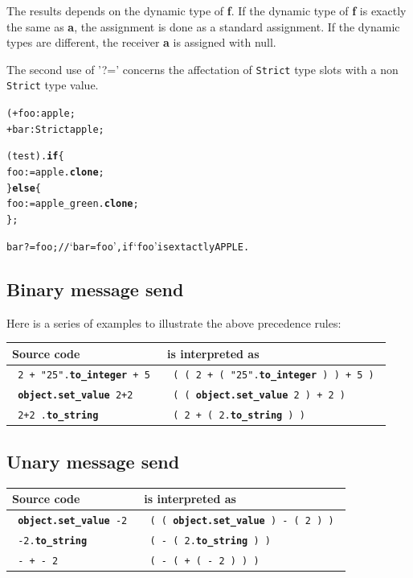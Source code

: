 \documentclass[11pt]{mybook}
\begin{document}
The results depends on the dynamic type of {\bf{}f}.
If the dynamic type of {\bf{}f} is exactly the same as {\bf{}a}, the assignment is done as a standard assignment.
If the dynamic types are different, the receiver {\bf{}a} is assigned with {\sc{}null}.

The second use of '?=' concerns the affectation of {\tt{}Strict} type slots  
with a non {\tt{}Strict} type value.
\begin{alltt}
  ( + foo:{\sc{}apple};
    + bar:{\tt{}Strict} {\sc{}apple};

    (test).{\bf{}if} \{
      foo := {\sc{}apple}.{\bf{}clone};
    \} {\bf{}else} \{
      foo := {\sc{}apple\_green}.{\bf{}clone};
    \}; 

   bar ?= foo; // `bar = foo', if `foo' is extactly APPLE.
\end{alltt}

\subsection{Binary message send}
\label{language_reference:late_binding:binary_msg_send}
%
Here is a series of examples to illustrate the above precedence
rules:

\noindent
\begin{tabularx}{\textwidth}{X X}
\hline
{\bf{}Source code}                       & {\bf{}is interpreted as} \\
\hline
\hline
{\tt{} 2 + "25".{\bf{}to\_integer} + 5 } & {\tt{} ( ( 2 + ( "25".{\bf{}to\_integer} ) ) + 5 ) } \\
\hline
{\tt{} {\bf{}object.set\_value} 2+2 }    & {\tt{} ( ( {\bf{}object.set\_value} 2 ) + 2 ) } \\
\hline
{\tt{} 2+2 .{\bf{}to\_string} }          & {\tt{} ( 2 + ( 2.{\bf{}to\_string} ) ) } \\
\hline
\end{tabularx}

\subsection{Unary message send}
\label{language_reference:late_binding:unary_msg_send}
%
\noindent
\begin{tabularx}{\textwidth}{X X}
\hline
{\bf{}Source code}                   & {\bf{}is interpreted as} \\
\hline
\hline
{\tt{} {\bf{}object.set\_value} -2 } & {\tt{} ( ( {\bf{}object.set\_value} ) - ( 2 ) ) } \\
\hline
{\tt{} -2.{\bf{}to\_string}}         & {\tt{} ( - ( 2.{\bf{}to\_string} ) )} \\
\hline
{\tt{} - + - 2 }                     & {\tt{} ( - ( + ( - 2 ) ) ) } \\
\hline
\end{tabularx}
\end{document}
